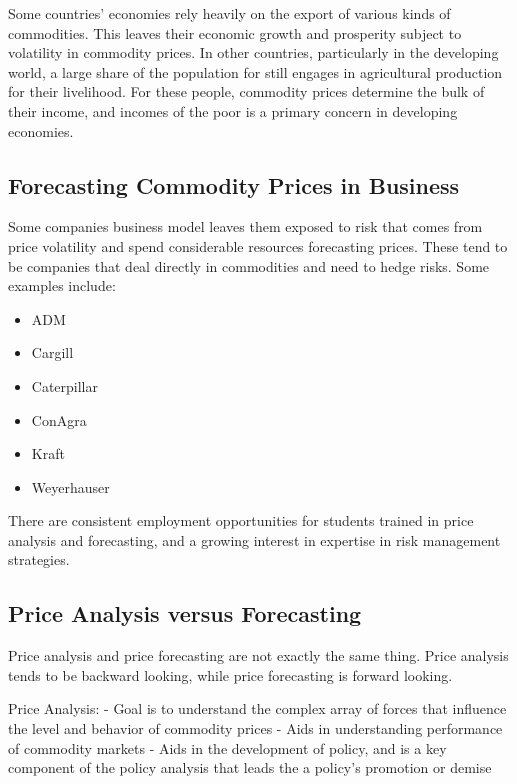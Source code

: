\documentclass[
  letterpaper,
  DIV=11,
  numbers=noendperiod]{scrreprt}
\providecommand{\tightlist}{%
  \setlength{\itemsep}{0pt}\setlength{\parskip}{0pt}}\usepackage{longtable,booktabs,array}
\begin{document}
Some countries' economies rely heavily on the export of various kinds of
commodities. This leaves their economic growth and prosperity subject to
volatility in commodity prices. In other countries, particularly in the
developing world, a large share of the population for still engages in
agricultural production for their livelihood. For these people,
commodity prices determine the bulk of their income, and incomes of the
poor is a primary concern in developing economies.

\hypertarget{forecasting-commodity-prices-in-business}{%
\subsection{Forecasting Commodity Prices in
Business}\label{forecasting-commodity-prices-in-business}}

Some companies business model leaves them exposed to risk that comes
from price volatility and spend considerable resources forecasting
prices. These tend to be companies that deal directly in commodities and
need to hedge risks. Some examples include:

\begin{itemize}
\tightlist
\item
  ADM
\item
  Cargill
\item
  Caterpillar
\item
  ConAgra
\item
  Kraft
\item
  Weyerhauser
\end{itemize}

There are consistent employment opportunities for students trained in
price analysis and forecasting, and a growing interest in expertise in
risk management strategies.

\hypertarget{price-analysis-versus-forecasting}{%
\subsection{Price Analysis versus
Forecasting}\label{price-analysis-versus-forecasting}}

Price analysis and price forecasting are not exactly the same thing.
Price analysis tends to be backward looking, while price forecasting is
forward looking.

Price Analysis: - Goal is to understand the complex array of forces that
influence the level and behavior of commodity prices - Aids in
understanding performance of commodity markets - Aids in the development
of policy, and is a key component of the policy analysis that leads the
a policy's promotion or demise
\end{document}
